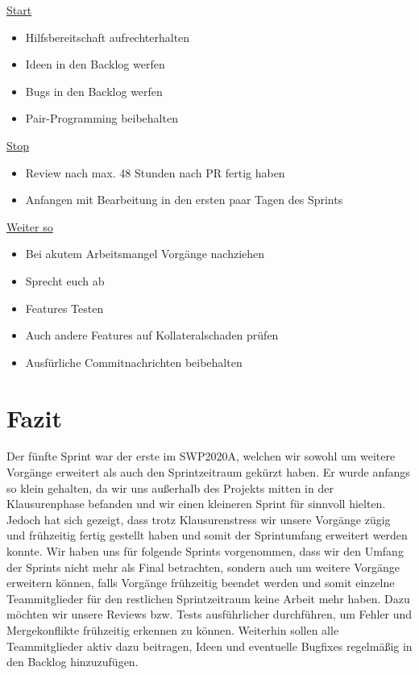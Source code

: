 \documentclass[12pt,a4paper, oneside]{article}
\begin{document}
    \underline{Start}
    \begin{itemize}
        \item Hilfsbereitschaft aufrechterhalten
        \item Ideen in den Backlog werfen
        \item Bugs in den Backlog werfen
        \item Pair-Programming beibehalten
        \\
    \end{itemize}

    \underline{Stop}
    \begin{itemize}
        \item Review nach max. 48 Stunden nach PR fertig haben
        \item Anfangen mit Bearbeitung in den ersten paar Tagen des Sprints
        \\
    \end{itemize}

    \underline{Weiter so}
    \begin{itemize}
        \item Bei akutem Arbeitsmangel Vorgänge nachziehen
        \item Sprecht euch ab
        \item Features Testen
        \item Auch andere Features auf Kollateralschaden prüfen
        \item Ausfürliche Commitnachrichten beibehalten
        \\
    \end{itemize}


    \section{Fazit}
    Der fünfte Sprint war der erste im SWP2020A, welchen wir sowohl um weitere Vorgänge erweitert als auch den Sprintzeitraum gekürzt haben. Er wurde anfangs so klein gehalten, da wir uns außerhalb des Projekts mitten in der Klausurenphase befanden und wir einen kleineren Sprint für sinnvoll hielten. Jedoch hat sich gezeigt, dass trotz Klausurenstress wir unsere Vorgänge zügig und frühzeitig fertig gestellt haben und somit der Sprintumfang erweitert werden konnte.
    Wir haben uns für folgende Sprints vorgenommen, dass wir den Umfang der Sprints nicht mehr als Final betrachten, sondern auch um weitere Vorgänge erweitern können, falls Vorgänge frühzeitig beendet werden und somit einzelne Teammitglieder für den restlichen Sprintzeitraum keine Arbeit mehr haben.
    Dazu möchten wir unsere Reviews bzw. Tests ausführlicher durchführen, um Fehler und Mergekonflikte frühzeitig erkennen zu können.
    Weiterhin sollen alle Teammitglieder aktiv dazu beitragen, Ideen und eventuelle Bugfixes regelmäßig in den Backlog hinzuzufügen.
\end{document}
